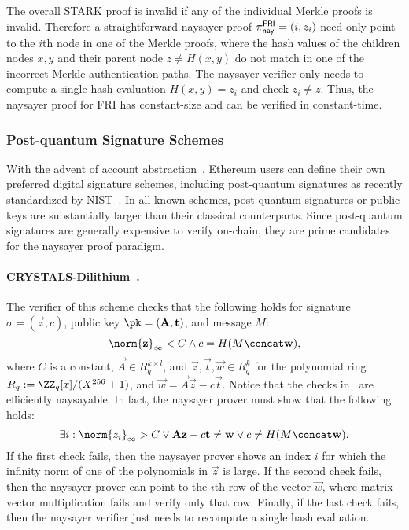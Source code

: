 The overall STARK proof is invalid if any of the individual Merkle proofs is invalid. Therefore a straightforward naysayer proof $\pi^{\mathsf{FRI}}_{\mathsf{nay}}=(i,z_{i})$ need only point to the $i$th node in one of the Merkle proofs, where the hash values of the children nodes $x,y$ and their parent node $z\neq H(x,y)$ do not match in one of the incorrect Merkle authentication paths. The naysayer verifier only needs to compute a single hash evaluation $H(x,y)=z_{i}$ and check $z_{i}\neq z$. Thus, the naysayer proof for FRI has constant-size and can be verified in constant-time. 

\subsubsection{Post-quantum Signature Schemes}\label{sec:pqsig_naysayer}

With the advent of account abstraction~\cite{accountabstraction}, Ethereum users can define their own preferred digital signature schemes, including post-quantum signatures as recently standardized by NIST~\cite{CCS:BHKNRS19,TCHES:DKLLS18,NISTPQC:FALCON22}.
In all known schemes, %
post-quantum signatures or public keys are substantially larger than their classical counterparts.  Since post-quantum signatures are generally expensive to verify on-chain, they are prime candidates for the naysayer proof paradigm.

\paragraph{CRYSTALS-Dilithium~\cite{TCHES:DKLLS18}.} The verifier of this scheme checks that the following holds for signature $\sigma=(\vec{z},c)$, public key $\pk=(\vec{A},\vec{t})$, and message $M$:
\begin{equation}\label{eq:crystals_verifier_check}
    \norm{\vec{z}}_\infty < C \land c=H(M \concat \vec{w}),
\end{equation}
where $C$ is a constant, $\vec{A}\in R_q^{k\times l}$, and $\vec{z},\vec{t},\vec{w}\in R_q^k$ for the polynomial ring $R_q:=\ZZ_q[x]/(X^{256}+1)$, and $\vec{w} = \vec{A}\vec{z}-c\vec{t}$. Notice that the checks in~ are efficiently naysayable. In fact, the naysayer prover must show that the following holds: 
\begin{equation}\label{eq:crystals_naysayer_prover}
    \exists i: \norm{z_i}_{\infty}>C 
    \lor \vec{A}\vec{z}-c\vec{t} \neq \vec{w} \lor 
    c\neq H(M \concat \vec{w}).
\end{equation}
If the first check fails, then the naysayer prover shows an index $i$ for which the infinity norm of one of the polynomials in $\vec{z}$ is large. If the second check fails, then the naysayer prover can point to the $i$th row of the vector $\vec{w}$, where matrix-vector multiplication fails and verify only that row. Finally, if the last check fails, then the naysayer verifier just needs to recompute a single hash evaluation.

